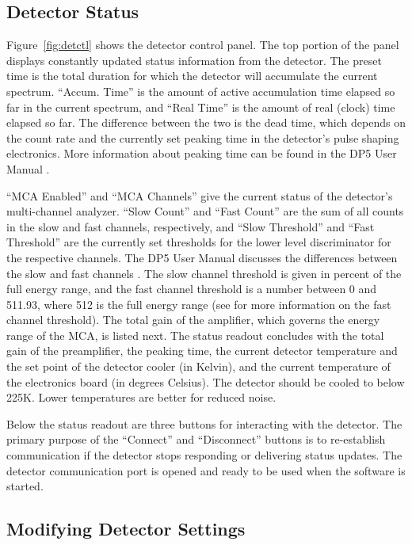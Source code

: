 \subsection{Detector Status}

Figure~\ref{fig:detctl} shows the detector control panel. The top portion of the panel displays constantly updated status information from the detector. The preset time is the total duration for which the detector will accumulate the current spectrum. ``Accum. Time'' is the amount of active accumulation time elapsed so far in the current spectrum, and ``Real Time'' is the amount of real (clock) time elapsed so far. The difference between the two is the dead time, which depends on the count rate and the currently set peaking time in the detector's pulse shaping electronics. More information about peaking time can be found in the DP5 User Manual \cite[p.~8]{dp5_user_man}.

``MCA Enabled'' and ``MCA Channels'' give the current status of the detector's multi-channel analyzer. ``Slow Count'' and ``Fast Count'' are the sum of all counts in the slow and fast channels, respectively, and ``Slow Threshold'' and ``Fast Threshold'' are the currently set thresholds for the lower level discriminator for the respective channels.
The DP5 User Manual discusses the differences between the slow and fast channels \cite[p.~7-8]{dp5_user_man}. The slow channel threshold is given in percent of the full energy range, and the fast channel threshold is a number between 0 and 511.93, where 512 is the full energy range (see \cite[p.~162]{dp5_prog_guide} for more information on the fast channel threshold).
The total gain of the amplifier, which governs the energy range of the MCA, is listed next. The status readout concludes with the total gain of the preamplifier, the peaking time, the current detector temperature and the set point of the detector cooler (in Kelvin), and the current temperature of the electronics board (in degrees Celsius). The detector should be cooled to below 225K. Lower temperatures are better for reduced noise.

Below the status readout are three buttons for interacting with the detector. The primary purpose of the ``Connect'' and ``Disconnect'' buttons is to re-establish communication if the detector stops responding or delivering status updates. The detector communication port is opened and ready to be used when the software is started.

\subsection{Modifying Detector Settings}

